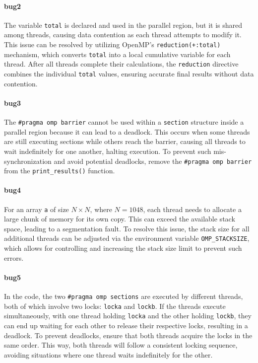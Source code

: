 \documentclass[unicode,11pt,a4paper,oneside,numbers=endperiod,openany]{scrartcl}
\begin{document}
\paragraph{bug2}
The variable \texttt{total} is declared and used in the parallel region, but it is shared among threads, causing data contention as each thread attempts to modify it. This issue can be resolved by utilizing OpenMP's \texttt{reduction(+:total)} mechanism, which converts \texttt{total} into a local cumulative variable for each thread. After all threads complete their calculations, the \texttt{reduction} directive combines the individual \texttt{total} values, ensuring accurate final results without data contention.
\paragraph{bug3}
The \texttt{\#pragma omp barrier} cannot be used within a \texttt{section} structure inside a parallel region because it can lead to a deadlock. This occurs when some threads are still executing sections while others reach the barrier, causing all threads to wait indefinitely for one another, halting execution. To prevent such mis-synchronization and avoid potential deadlocks, remove the \texttt{\#pragma omp barrier} from the \texttt{print\_results()} function.
\paragraph{bug4}
For an array \texttt{a} of size \( N \times N \), where \( N = 1048 \), each thread needs to allocate a large chunk of memory for its own copy. This can exceed the available stack space, leading to a segmentation fault. To resolve this issue, the stack size for all additional threads can be adjusted via the environment variable \texttt{OMP\_STACKSIZE}, which allows for controlling and increasing the stack size limit to prevent such errors.
\paragraph{bug5}
In the code, the two \texttt{\#pragma omp sections} are executed by different threads, both of which involve two locks: \texttt{locka} and \texttt{lockb}. If the threads execute simultaneously, with one thread holding \texttt{locka} and the other holding \texttt{lockb}, they can end up waiting for each other to release their respective locks, resulting in a deadlock. To prevent deadlocks, ensure that both threads acquire the locks in the same order. This way, both threads will follow a consistent locking sequence, avoiding situations where one thread waits indefinitely for the other.
\end{document}
